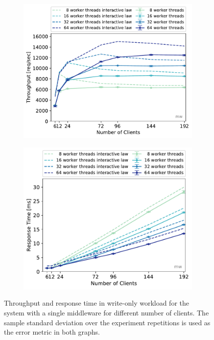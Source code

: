 \documentclass[11pt,a4paper]{article}
\begin{document}
\begin{figure}
	\begin{subfigure}[b]{.499\linewidth}
		\centering
		\includegraphics[width=\linewidth]{data/exp31_wo_tp_nc_w.pdf}
	\end{subfigure}\hfill
	\begin{subfigure}[b]{.499\linewidth}
		\centering
		\includegraphics[width=\linewidth]{data/exp31_wo_rt_nc_w.pdf}
	\end{subfigure}
	\caption{Throughput and response time in write-only workload for the system with a single middleware for different number of clients. The sample standard deviation over the experiment repetitions is used as the error metric in both graphs.}\label{exp31_wo_tp_nc}
\end{figure}
\end{document}
